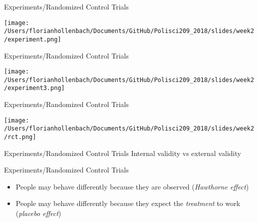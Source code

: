 \documentclass[presentation]{beamer}
\begin{document}
\begin{frame}[label={sec:org3982e5e}]{Experiments/Randomized Control Trials}
\begin{center}
\texttt{[image: /Users/florianhollenbach/Documents/GitHub/Polisci209\_2018/slides/week2/experiment.png]}
\end{center}
\end{frame}


\begin{frame}[label={sec:org4d894f6}]{Experiments/Randomized Control Trials}
\begin{center}
\texttt{[image: /Users/florianhollenbach/Documents/GitHub/Polisci209\_2018/slides/week2/experiment3.png]}
\end{center}
\end{frame}


\begin{frame}[label={sec:orgf33abaa}]{Experiments/Randomized Control Trials}
\begin{center}
\texttt{[image: /Users/florianhollenbach/Documents/GitHub/Polisci209\_2018/slides/week2/rct.png]}
\end{center}
\end{frame}


\begin{frame}[label={sec:org446da45}]{Experiments/Randomized Control Trials}
\Large{Internal validity vs external validity}
\end{frame}


\begin{frame}[label={sec:org9a281a7}]{Experiments/Randomized Control Trials}
\begin{itemize}
\item People may behave differently because they are observed (\emph{Hawthorne effect})
\item People may behave differently because they expect the \emph{treatment} to work (\emph{placebo effect})
\end{itemize}
\end{frame}
\end{document}
